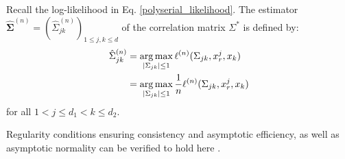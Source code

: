 \begin{definition}\label{definition_case2}
    Recall the log-likelihood in Eq. \eqref{polyserial_likelihood}. The estimator $\hat{\boldsymbol{\Sigma}}^{(n)} = (\hat{\Sigma}_{jk}^{(n)})_{1\leq j, k\leq d}$ of the correlation matrix $\Sigma^*$ is defined by:
    \begin{equation}
        \begin{split}
            \hat{\Sigma}_{jk}^{(n)} &= \argmax_{\Abs{\Sigma_{jk}} \leq 1} \ell^{(n)}(\Sigma_{jk}, x^j_r,x_k) \\
            &= \argmax_{\Abs{\Sigma_{jk}} \leq 1} \frac{1}{n} \ell^{(n)}(\Sigma_{jk}, x^j_r,x_k)
        \end{split}
    \end{equation}
    for all $1 < j \leq d_1 < k \leq d_2$. 
\end{definition}
\noindent Regularity conditions ensuring consistency and asymptotic efficiency, as well as asymptotic normality can be verified to hold here \citep{Cox74}.

